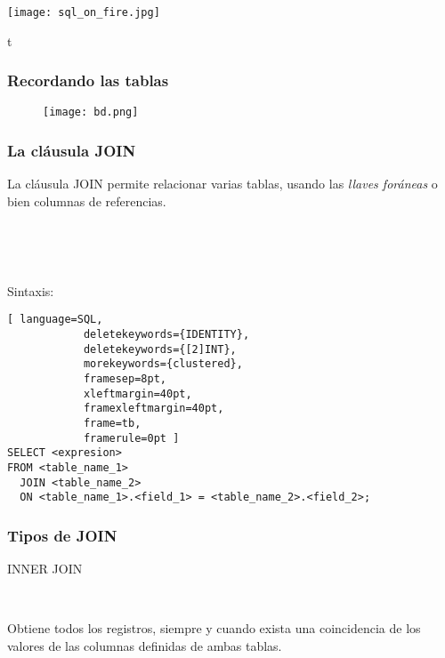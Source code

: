 {
	{%
		\texttt{[image: sql\_on\_fire.jpg]}
	}
	
	\begin{frame}
	\end{frame}
}


\begin{frame}{t}
	
	\frametitle{Recordando las tablas}
	
	\begin{figure}[h]
		\centering
		\texttt{[image: bd.png]}
	\end{figure}
	
	
\end{frame}


\begin{frame}[fragile]
	
		\frametitle{La cl\'ausula JOIN}
		
		La cláusula \textcolor{codepurple}{JOIN} permite relacionar varias tablas, usando las \emph{llaves foráneas} o bien columnas de referencias.
		
		\ 
		
		\ 
		
		\pause
		
		Sintaxis: 
		\begin{lstlisting}[ language=SQL,
			deletekeywords={IDENTITY},
			deletekeywords={[2]INT},
			morekeywords={clustered},
			framesep=8pt,
			xleftmargin=40pt,
			framexleftmargin=40pt,
			frame=tb,
			framerule=0pt ]
SELECT <expresion>
FROM <table_name_1>
  JOIN <table_name_2>
  ON <table_name_1>.<field_1> = <table_name_2>.<field_2>;
\end{lstlisting}
		
\end{frame}


\begin{frame}[fragile]
	
	\frametitle{Tipos de JOIN}
	
	\begin{center}
		
		\textcolor{codepurple}{INNER JOIN}
		
		\ 
		
		Obtiene todos los registros, siempre y cuando exista una coincidencia de los valores de las columnas definidas de ambas tablas.
		
		\begin{venndiagram2sets}[
			labelA={ }, labelOnlyA={Tabla1}, 
			labelB={ }, labelOnlyB={Tabla2}, 
			showframe=false]
			\fillACapB
		\end{venndiagram2sets}
		
	\end{center}
	
\end{frame}


